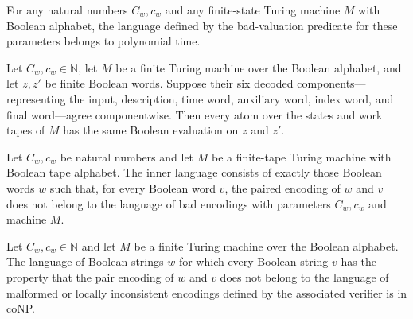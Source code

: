 \begin{theorem}
\label{Complexity.Meyer.badLang_mem_P}
\leanok
{}
For any natural numbers $C_w,c_w$ and any finite-state Turing machine $M$ with Boolean
alphabet, the language defined by the bad-valuation predicate for these parameters
belongs to polynomial time.
\end{theorem}

\begin{theorem}
\label{Complexity.Meyer.evalAtom_congr}
\leanok
{}
Let $C_w,c_w\in\mathbb{N}$, let $M$ be a finite Turing machine over the Boolean
alphabet, and let $z,z'$ be finite Boolean words. Suppose their six decoded
components—representing the input, description, time word, auxiliary word, index word,
and final word—agree componentwise. Then every atom over the states and work tapes of
$M$ has the same Boolean evaluation on $z$ and $z'$.
\end{theorem}

\begin{definition}
\label{Complexity.Meyer.innerLang}
\leanok
{}
Let $C_w,c_w$ be natural numbers and let $M$ be a finite-tape Turing machine with
Boolean tape alphabet. The inner language consists of exactly those Boolean words $w$
such that, for every Boolean word $v$, the paired encoding of $w$ and $v$ does not
belong to the language of bad encodings with parameters $C_w,c_w$ and machine $M$.
\end{definition}

\begin{theorem}
\label{Complexity.Meyer.innerLang_mem_coNP}
\leanok
{}
Let $C_w,c_w\in\mathbb{N}$ and let $M$ be a finite Turing machine over the Boolean
alphabet. The language of Boolean strings $w$ for which every Boolean string $v$ has the
property that the pair encoding of $w$ and $v$ does not belong to the language of
malformed or locally inconsistent encodings defined by the associated verifier is in
coNP.
\end{theorem}
